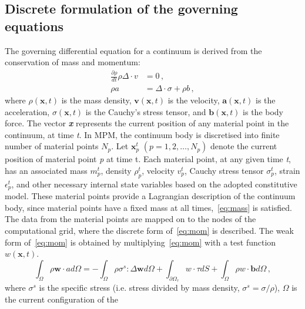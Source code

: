 \subsection{Discrete formulation of the governing equations}
The governing differential equation for a continuum is derived from the 
conservation of mass and momentum:
\begin{align}
\label{eq:mass}
\frac{\partial \rho}{dt}\rho \Delta \cdot \mathbf{\mathit{v}} & = 0 \,, \\   
 \label{eq:mom}
 \rho a & = \Delta \cdot \sigma + \rho \mathbf{\mathit{b}} \,,
\end{align}
where $\rho (\mathbf{x},t)$ is the mass density, $\mathit{\mathbf{v}} 
(\mathbf{x},t)$ is the velocity,  $\mathit{\mathbf{a}} (\mathbf{x},t)$ is the 
acceleration,  $\sigma (\mathbf{x},t)$ is the Cauchy's stress tensor, and  
$\mathit{\mathbf{b}} (\mathbf{x},t)$ is the body force. The vector 
\textbf{\textit{x}} represents the current position of any material point in 
the continuum, at time \textit{t}. In MPM, the continuum body is discretised 
into finite number of material points $\mathit{N}_{p}$. Let 
$\mathit{\mathbf{x}}_{p}^{t}$ $(\mathit{p}=1,2,\dots,\mathit{N}_{p})$ denote 
the current position of material point \textit{p} at time t.
Each material point, at any given time \textit{t}, has an associated mass 
$\mathit{m}_{p}^{t}$, density $\rho_{p}^{t}$, velocity 
$\mathbf{\mathit{v}}_{p}^{t}$, Cauchy stress tensor $\sigma_{p}^{t}$, strain 
$\epsilon_{p}^{t}$, and other necessary internal state variables based on the 
adopted constitutive model. These material points provide a Lagrangian 
description of the continuum body, since material points have a fixed mass at 
all times,~\cref{eq:mass} is satisfied. The data from the material points 
are mapped on to the nodes of the computational grid, where the discrete form 
of~\cref{eq:mom} is described. The weak form of~\cref{eq:mom} is 
obtained 
by multiplying~\cref{eq:mom} with a test function 
$\mathbf{\mathit{w}}(\mathbf{x},t)$.
\begin{equation}
\int_{\Omega}\rho \mathit{\mathbf{w}} \cdot \mathbf{\mathit{a}} 
\mathit{d}\Omega = - \int_{\Omega} \rho {\sigma}^{s} : \Delta 
\mathit{\mathbf{w}} \mathit{d}\Omega + \int_{{\partial \Omega}_{\tau}} 
\mathbf{\mathit{w}} \cdot \tau \mathit{d} \mathit{S} + \int_{\Omega}\rho 
\mathbf{\mathit{w}} \cdot \mathbf{b} \mathit{d} \Omega \,,
\label{eq:weak}
\end{equation}
where $\sigma^{s}$ is the specific stress (i.e. stress divided by mass density, 
$\sigma^{s} = \sigma / \rho$), $\Omega$ is the current configuration of the 
